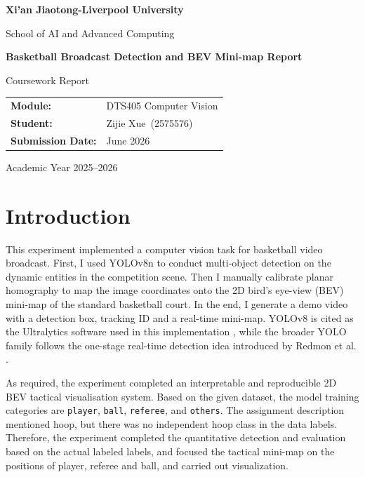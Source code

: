\documentclass[12pt,a4paper]{article}
\newcommand{\reporttitle}{Basketball Broadcast Detection and BEV Mini-map Report}
\newcommand{\studentname}{Zijie Xue}
\newcommand{\studentid}{2575576}
\newcommand{\modulename}{DTS405 Computer Vision}
\newcommand{\submissiondate}{June 2026}
\begin{document}
\begin{titlepage}
    \centering
    \vspace*{1.5cm}
    {\Large \textbf{Xi'an Jiaotong-Liverpool University}\par}
    \vspace{0.4cm}
    {\large School of AI and Advanced Computing\par}
    \vspace{2cm}
    {\huge \textbf{\reporttitle}\par}
    \vspace{1.2cm}
    {\Large Coursework Report\par}
    \vspace{2cm}
    \begin{tabular}{>{\bfseries}p{4cm}p{8.5cm}}
        Module: & \modulename \\
        Student: & \studentname\ (\studentid) \\
        Submission Date: & \submissiondate \\
    \end{tabular}
    \vfill
    {\large Academic Year 2025--2026\par}
\end{titlepage}

\newpage
\tableofcontents
\newpage


\section{Introduction}

This experiment implemented a computer vision task for basketball video broadcast. First, I used YOLOv8n to conduct multi-object detection on the dynamic entities in the competition scene. Then I manually calibrate planar homography to map the image coordinates onto the 2D bird's eye-view (BEV) mini-map of the standard basketball court. In the end, I generate a demo video with a detection box, tracking ID and a real-time mini-map. YOLOv8 is cited as the Ultralytics software used in this implementation \cite{jocher2023ultralytics}, while the broader YOLO family follows the one-stage real-time detection idea introduced by Redmon et al. \cite{redmon2016yolo}.

As required, the experiment completed an interpretable and reproducible 2D BEV tactical visualisation system. Based on the given dataset, the model training categories are \texttt{player}, \texttt{ball}, \texttt{referee}, and \texttt{others}. The assignment description mentioned hoop, but there was no independent hoop class in the data labels. Therefore, the experiment completed the quantitative detection and evaluation based on the actual labeled labels, and focused the tactical mini-map on the positions of player, referee and ball, and carried out visualization.
\end{document}
